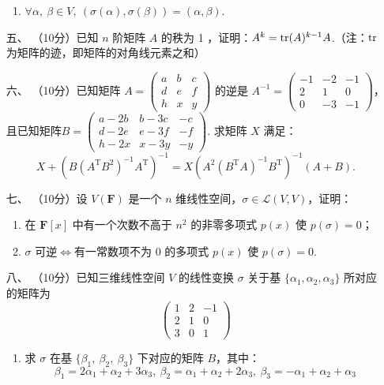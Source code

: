 \begin{enumerate}
\begin{enumerate}
        \item $\forall \alpha,\ \beta \in V,\ \left(\sigma (\alpha),\sigma (\beta) \right)=\left(\alpha,\beta\right)$.
    \end{enumerate}
	\item[五、]（10分）已知 $n$ 阶矩阵 $A$ 的秩为 1 ，证明：$A^k=\textup{tr}(A)^{k-1}A$.（注：$\textup{tr}$ 为矩阵的迹，即矩阵的对角线元素之和）
	\item[六、] （10分）已知矩阵 $A=\begin{pmatrix}a & b & c \\ d & e & f \\ h & x & y\end{pmatrix}$ 的逆是 $A^{-1}=\begin{pmatrix}-1 & -2 & -1 \\ 2 & 1 & 0 \\ 0 & -3 & -1\end{pmatrix}$，且已知矩阵$B=\begin{pmatrix}a-2b & b-3c & -c \\ d-2e & e-3f & -f \\ h-2x & x-3y & -y\end{pmatrix}$. 求矩阵 $X$ 满足：
    \[X+(B(A^\mathrm{T}B^2)^{-1}A^\mathrm{T})^{-1}=X(A^2(B^\mathrm{T}A)^{-1}B^\mathrm{T})^{-1}(A+B).\]
	\item[七、]（10分）设 $V(\mathbf{F})$ 是一个 $n$ 维线性空间，$\sigma \in \mathcal{L}(V,V)$，证明：
    \begin{enumerate}[label=(\arabic*)]
        \item 在 $\mathbf{F}[x]$ 中有一个次数不高于 $n^2$ 的非零多项式 $p(x)$ 使 $p(\sigma)=0$；

        \item $\sigma$ 可逆$\iff$有一常数项不为 0 的多项式 $p(x)$ 使 $p(\sigma)=0$.
    \end{enumerate}

\item[八、]（10分）已知三维线性空间 $V$ 的线性变换 $\sigma$ 关于基 $\{\alpha_1,\alpha_2,\alpha_3\}$ 所对应的矩阵为
    \[\begin{pmatrix}1 & 2 & -1 \\ 2 & 1 & 0 \\ 3 & 0 & 1\end{pmatrix}\]
    \begin{enumerate}[label=(\arabic*)]
        \item 求 $\sigma$ 在基 $\{\beta_1,\ \beta_2,\ \beta_3\}$ 下对应的矩阵 $B$，其中：
        \[\beta_1=2\alpha_1+\alpha_2+3\alpha_3,\ \beta_2=\alpha_1+\alpha_2+2\alpha_3,\ \beta_3=-\alpha_1+\alpha_2+\alpha_3\]


\end{enumerate}
\end{enumerate}
